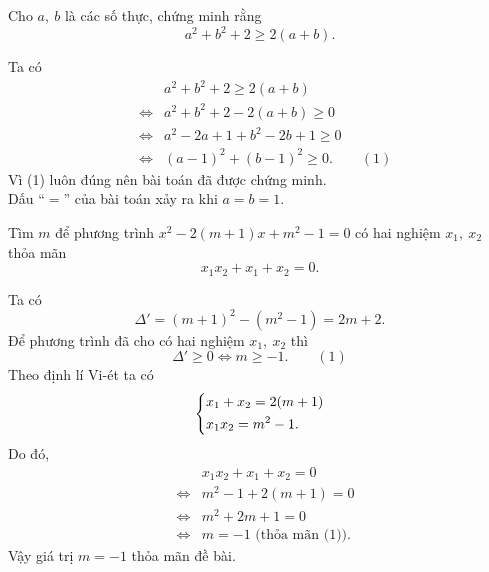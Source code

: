 \begin{bt}%
	Cho $a,~b$ là các số thực, chứng minh rằng \[a^2+b^2+2\ge2(a+b). \]
	
	\loigiai
	{
		Ta có 
		\begin{eqnarray*}
			& & a^2+b^2+2\ge2(a+b)\\
			& \Leftrightarrow & a^2+b^2+2-2(a+b)\ge0\\
			& \Leftrightarrow & a^2-2a+1+b^2-2b+1\ge0\\
			& \Leftrightarrow & (a-1)^2+(b-1)^2\ge0.\qquad (1)
		\end{eqnarray*}
		Vì (1) luôn đúng nên bài toán đã được chứng minh.\\
		Dấu ``$=$'' của bài toán xảy ra khi $a=b=1$.
	}
\end{bt}

\begin{bt}%
	Tìm $m$ để phương trình $x^2-2(m+1)x+m^2-1=0$ có hai nghiệm $x_1,~x_2$ thỏa mãn 
	\[x_1x_2+x_1+x_2=0.\]
	
	\loigiai
	{
		Ta có 
		\[\Delta'=(m+1)^2-(m^2-1)=2m+2.\]
		Để phương trình đã cho có hai nghiệm $x_1,~x_2$ thì
		\[\Delta'\ge0\Leftrightarrow m\ge-1.\qquad(1)\]
		Theo định lí Vi-ét ta có 
		\[\left\{\begin{aligned}&x_1+x_2=2(m+1)\\&x_1x_2=m^2-1.\end{aligned}\right.\]
		Do đó, 
		\begin{eqnarray*}
			& &x_1x_2+x_1+x_2=0 \\
			& \Leftrightarrow & m^2-1+2(m+1)=0 \\
			& \Leftrightarrow & m^2+2m+1=0 \\
			& \Leftrightarrow & m=-1 \text{ (thỏa mãn (1)).}
		\end{eqnarray*}
		Vậy giá trị $m=-1$ thỏa mãn đề bài.
	}
\end{bt}

